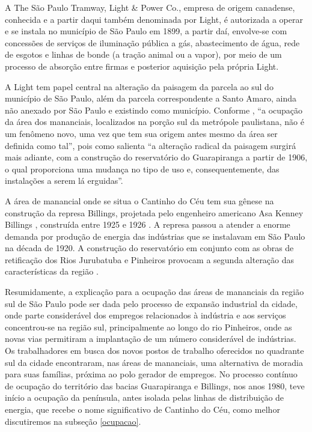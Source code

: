 	A The São Paulo Tramway, Light \& Power Co., empresa de origem canadense, conhecida e a partir daqui também denominada por Light, é autorizada a operar e se instala no município de São Paulo em 1899, a partir daí, envolve-se com concessões de serviços de iluminação pública a gás, abastecimento de água, rede de esgotos e linhas de bonde (a tração animal ou a vapor), por meio de um processo de absorção entre firmas e posterior aquisição pela própria Light.
	
	A Light tem papel central na alteração da paisagem da parcela ao sul do município de São Paulo, além da parcela correspondente a Santo Amaro, ainda não anexado por São Paulo e existindo como município. Conforme , ``a ocupação da área dos mananciais, localizados na porção sul da metrópole paulistana, não é um fenômeno novo, uma vez que tem sua origem antes mesmo da área ser definida como tal'', pois como salienta  ``a alteração radical da paisagem surgirá mais adiante, com a construção do reservatório do Guarapiranga a partir de 1906, o qual proporciona uma mudança no tipo de uso e, consequentemente, das instalações a serem lá erguidas''.
	
	A área de manancial onde se situa o Cantinho do Céu tem sua gênese na construção da represa Billings, projetada pelo engenheiro americano Asa Kenney Billings \cite[p.46]{Francca2000}, construída entre 1925 e 1926 \cite[p.53]{Francca2000}. A represa passou a atender a enorme demanda por produção de energia das indústrias que se instalavam em São Paulo na década de 1920. A construção do reservatório em conjunto com as obras de retificação dos Rios Jurubatuba e Pinheiros provocam a segunda alteração das características da região \cite[p.53]{Francca2000}.

	Resumidamente, a explicação para a ocupação das áreas de mananciais da região sul de São Paulo pode ser dada pelo processo de expansão industrial da cidade, onde parte considerável dos empregos relacionados à indústria e aos serviços concentrou-se na região sul, principalmente ao longo do rio Pinheiros, onde as novas vias permitiram a implantação de um número considerável de indústrias. Os trabalhadores em busca dos novos postos de trabalho oferecidos no quadrante sul da cidade encontraram, nas áreas de mananciais, uma alternativa de moradia para suas famílias, próxima ao polo gerador de empregos. No processo contínuo de ocupação do território das bacias Guarapiranga e Billings, nos anos 1980, teve início a ocupação da península, antes isolada pelas linhas de distribuição de energia, que recebe o nome significativo de Cantinho do Céu, como melhor discutiremos na subseção \ref{ocupacao}.
	
